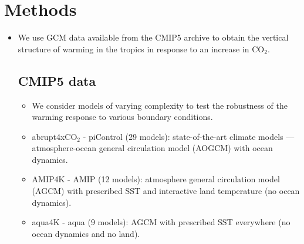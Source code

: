 \documentclass[draft]{agujournal2019}
\begin{document}
\section{Methods}

\begin{itemize}

\item We use GCM data available from the CMIP5 archive to obtain the vertical structure of warming in the tropics in response to an increase in CO$_2$.

\subsection{CMIP5 data}

\begin{itemize}
\item We consider models of varying complexity to test the robustness of the warming response to various boundary conditions.
\item abrupt4xCO$_2$ - piControl (29 models): state-of-the-art climate models --- atmosphere-ocean general circulation model (AOGCM) with ocean dynamics.
\item AMIP4K - AMIP (12 models): atmosphere general circulation model (AGCM) with prescribed SST and interactive land temperature (no ocean dynamics).
\item aqua4K - aqua (9 models): AGCM with prescribed SST everywhere (no ocean dynamics and no land).
\end{itemize}


\end{itemize}
\end{document}
